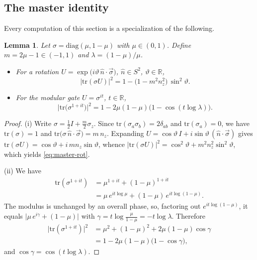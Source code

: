 \documentclass[twoside,11pt,letter]{article}
\def\bR{\mathbb{R}}
\newcommand{\tr}{\mathrm{tr}}
\newcommand{\diag}{\mathrm{diag}}
\theoremstyle{definition}
\theoremstyle{definition}
\theoremstyle{plain}
\newtheorem{lemma}[theorem]{Lemma}
\begin{document}
\subsection{The master identity}
\label{sec:AW-master}

Every computation of this section is a specialization of the following.

\begin{lemma}
\label{lem:master}
Let $\sigma = \diag(\mu, 1-\mu)$ with $\mu \in (0,1)$. Define $m = 2\mu - 1 \in (-1,1)$ and $\lambda = (1-\mu)/\mu$.
\begin{itemize}
\item[(i)] For a rotation $U = \exp\bigl( i \vartheta\, \hat n \cdot \vec\sigma \bigr)$, $\hat n \in S^2$, $\vartheta \in \bR$,
\begin{equation}
\label{eq:master-rot}
|\tr( \sigma U )|^{2}= 1 - \bigl( 1 - m^2 n_z^2 \bigr)\, \sin^2 \vartheta .
\end{equation}
\item[(ii)] For the modular gate $U = \sigma^{it}$, $t \in \bR$,
\begin{equation}
\label{eq:master-mod}
\bigl| \tr\bigl( \sigma^{1+it} \bigr) \bigr|^{2} = 1 - 2\mu(1-\mu) \bigl( 1 - \cos( t \log \lambda) \bigr) .
\end{equation}
\end{itemize}
\end{lemma}

\begin{proof}
(i) Write $\sigma = \tfrac12 I + \tfrac{m}{2} \sigma_z$. Since $\tr(\sigma_a \sigma_b) = 2 \delta_{ab}$ and $\tr(\sigma_a) = 0$, we have $\tr(\sigma) = 1$ and
$\tr\bigl( \sigma\, \hat n \cdot \vec\sigma \bigr) = m\, n_z$. Expanding $U = \cos\vartheta \, I + i \sin\vartheta \, ( \hat n \cdot \vec\sigma )$ gives
$\tr(\sigma U) = \cos\vartheta + i\, m n_z \sin\vartheta$, whence $|\tr(\sigma U)|^2 = \cos^2\vartheta + m^2 n_z^2 \sin^2\vartheta$, which yields
\eqref{eq:master-rot}.

(ii) We have
\begin{equation*}
\begin{split}
\tr(\sigma^{1+it}) &= \mu^{1+it} + (1-\mu)^{1+it}\\
&= \mu\, e^{it\log\mu} + (1-\mu)\, e^{it \log(1-\mu)}.
\end{split}
\end{equation*}
The modulus is unchanged by an overall phase, so, factoring out $e^{it\log(1-\mu)}$, it equals $\bigl| \mu\, e^{i\gamma} + (1-\mu) \bigr|$ with $\gamma = t \log\frac{\mu}{1-\mu} = - t \log \lambda$. Therefore
\begin{equation*}
\begin{split}
\bigl| \tr(\sigma^{1+it}) \bigr|^2&= \mu^2 + (1-\mu)^2 + 2\mu(1-\mu)\cos\gamma\\
&= 1 - 2\mu(1-\mu)\bigl( 1 - \cos\gamma \bigr),
\end{split}
\end{equation*}
and $\cos\gamma = \cos(t\log\lambda)$.
\end{proof}
\end{document}
